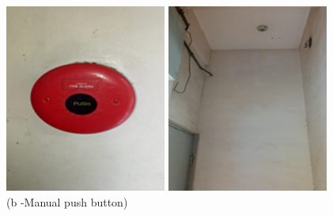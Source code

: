 \begin{figure}
\begin{minipage}[b]{0.2\linewidth}
				\includegraphics[width=\textwidth]{figures/fig_ch04_fdas_mpb}
		\caption*{(b -Manual push button)}
	\end{minipage}
	\hspace{0.05cm}
	\begin{minipage}[b]{0.2\linewidth}
		\centering
			\includegraphics[width=\textwidth]{figures/fig_ch04_fdas_missingbell}

\end{minipage}
\end{figure}
